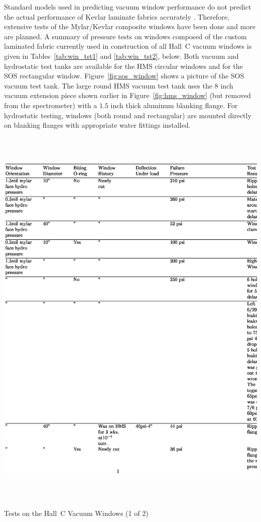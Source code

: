 Standard models used in predicting vacuum
window performance do not predict the actual performance of Kevlar laminate
fabrics accurately \cite{rbrook1,rllnl2}. Therefore, extensive tests of the
Mylar/Kevlar composite windows have been done and more are planned.
A summary of pressure
tests on windows composed of the custom laminated
fabric currently used in construction of all Hall~C vacuum windows is
given in Tables~\ref{tab:win_tst1} and \ref{tab:win_tst2}, below. Both vacuum and hydrostatic test 
tanks
are available for the HMS circular windows and for the SOS rectangular
window. Figure~\ref{fig:sos_window} shows a picture of the SOS vacuum
test tank.  The large round
HMS vacuum test tank uses the $8$ inch vacuum extension piece shown
earlier in Figure~\ref{fig:hms_window} (but removed from the spectrometer) with a $1.5$
inch thick aluminum blanking flange. For hydrostatic testing, windows (both
round and rectangular) are mounted directly on
blanking flanges with appropriate water fittings installed.

\begin{table}
\includegraphics[height=7.5in]{vacuum.ps}
\caption{Tests on the Hall~C Vacuum Windows (1 of 2) \label{tab:win_tst1}} 
\end{table}
\clearpage

